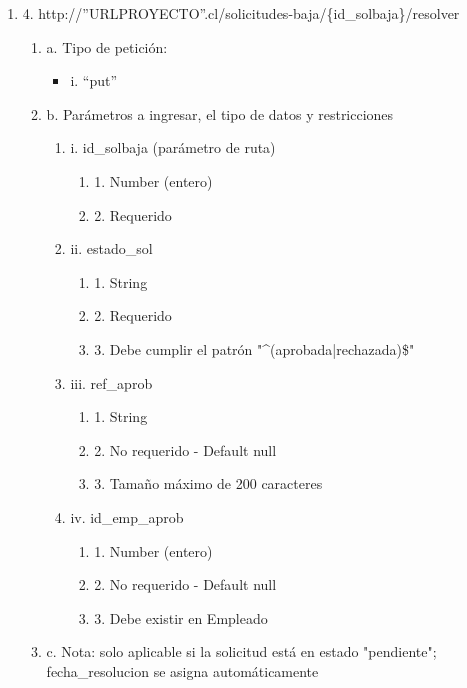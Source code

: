 \begin{enumerate}
    \item 4. http://”URLPROYECTO”.cl/solicitudes-baja/\{id\_solbaja\}/resolver
    \begin{enumerate}
        \item a. Tipo de petición:
            \begin{itemize}
               \item i. “put”
            \end{itemize}
        \item b. Parámetros a ingresar, el tipo de datos y restricciones
            \begin{enumerate}
                \item i. id\_solbaja (parámetro de ruta)
                    \begin{enumerate}
                        \item 1. Number (entero)
                        \item 2. Requerido
                    \end{enumerate}
                \item ii. estado\_sol
                    \begin{enumerate}
                        \item 1. String
                        \item 2. Requerido
                        \item 3. Debe cumplir el patrón "^(aprobada|rechazada)\$"
                    \end{enumerate}
                \item iii. ref\_aprob
                    \begin{enumerate}
                        \item 1. String
                        \item 2. No requerido - Default null
                        \item 3. Tamaño máximo de 200 caracteres
                    \end{enumerate}
                \item iv. id\_emp\_aprob
                    \begin{enumerate}
                        \item 1. Number (entero)
                        \item 2. No requerido - Default null
                        \item 3. Debe existir en Empleado
                    \end{enumerate}
            \end{enumerate}
        \item c. Nota: solo aplicable si la solicitud está en estado "pendiente"; fecha\_resolucion se asigna automáticamente
    \end{enumerate}


\end{enumerate}
